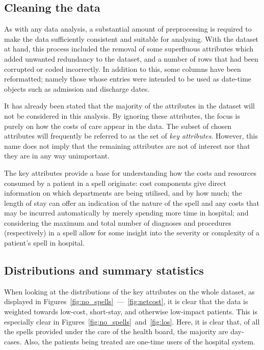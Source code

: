 \subsection{Cleaning the data}\label{subsec:formatting}

As with any data analysis, a substantial amount of preprocessing is required to
make the data sufficiently consistent and suitable for analysing.  With the
dataset at hand, this process included the removal of some superfluous
attributes which added unwanted redundancy to the dataset, and a number of rows
that had been corrupted or coded incorrectly. In addition to this, some columns
have been reformatted; namely those whose entries were intended to be used as
date-time objects such as admission and discharge dates.

It has already been stated that the majority of the attributes in the dataset
will not be considered in this analysis. By ignoring these attributes, the focus
is purely on how the costs of care appear in the data. The subset of chosen
attributes will frequently be referred to as the set of \emph{key attributes}.
However, this name does not imply that the remaining attributes are not of
interest nor that they are in any way unimportant.

The key attributes provide a base for understanding how the costs and resources
consumed by a patient in a spell originate: cost components give direct
information on which departments are being utilised, and by how much; the length
of stay can offer an indication of the nature of the spell and any costs that
may be incurred automatically by merely spending more time in hospital; and
considering the maximum and total number of diagnoses and procedures
(respectively) in a spell allow for some insight into the severity or complexity
of a patient's spell in hospital.

\subsection{Distributions and summary statistics}%
\label{subsec:distributions_statistics}
\graphicspath{{chapters/data/paper/img/overview/}}

When looking at the distributions of the key attributes on the whole dataset, as
displayed in Figures~\ref{fig:no_spells}~---~\ref{fig:netcost}, it is clear that
the data is weighted towards low-cost, short-stay, and otherwise low-impact
patients. This is especially clear in
Figures~\ref{fig:no_spells}~and~\ref{fig:los}. Here, it is clear that, of all
the spells provided under the care of the health board, the majority are
day-cases. Also, the patients being treated are one-time users of the hospital
system.

